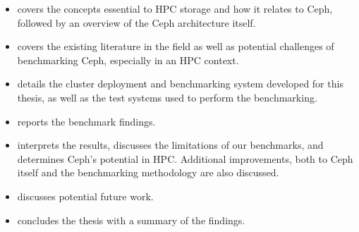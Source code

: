 \begin{itemize}
    \item {} covers the concepts essential to \ac{HPC} storage and how it relates to Ceph, followed by an overview of the Ceph architecture itself.
    \item {} covers the existing literature in the field as well as potential challenges of benchmarking Ceph, especially in an \ac{HPC} context.
    \item {} details the cluster deployment and benchmarking system developed for this thesis, as well as the test systems used to perform the benchmarking.
    \item {} reports the benchmark findings.
    \item {} interprets the results, discusses the limitations of our benchmarks, and determines Ceph's potential in \ac{HPC}. Additional improvements, both to Ceph itself and the benchmarking methodology are also discussed.
    \item {} discusses potential future work.
    \item {} concludes the thesis with a summary of the findings.
\end{itemize}